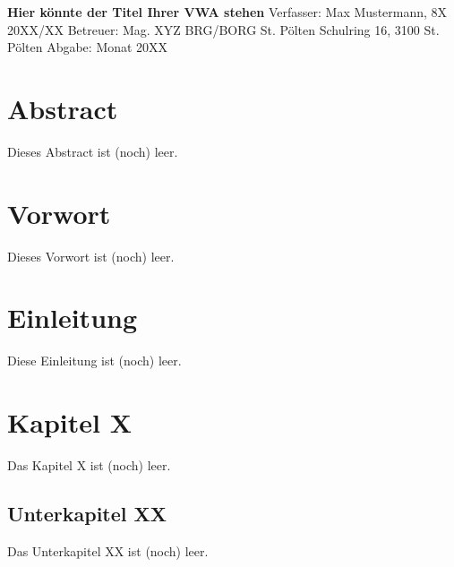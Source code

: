 \documentclass[a4paper,12pt,ngerman,oneside]{scrreprt}	%
\begin{document}
	

	\begin{titlepage}\label{Titleseite}
		
		\vspace*{80mm}\Huge\centering\textbf{Hier könnte der Titel Ihrer VWA stehen\break}
		\vspace{0mm}\hrulefill
		\vspace{7mm}\Large{\break Verfasser: Max Mustermann, 8X 20XX/XX \break Betreuer: Mag. XYZ}
		\vspace{15mm}\Large{\break BRG/BORG St. Pölten \break Schulring 16, 3100 St. Pölten}
		\vspace{70mm}\Large{\break Abgabe: Monat 20XX}
		
	\end{titlepage}
	
	
	\renewcommand{\abstractname}{Abstract}	
	\chapter*{Abstract}\label{Abstract}
		Dieses Abstract ist (noch) leer.
		\thispagestyle{empty}
	
	\chapter*{Vorwort}\label{Vorwort}
		Dieses Vorwort ist (noch) leer.
		\thispagestyle{empty}
	


	\begingroup
		\renewcommand*{\chapterpagestyle}{empty}
		\pagestyle{empty}
		\tableofcontents
		\clearpage
	\endgroup

	
	\chapter{Einleitung}\label{Einleitung}
	Diese Einleitung ist (noch) leer.
	



	\chapter{Kapitel X}
	Das Kapitel X ist (noch) leer.
		\section{Unterkapitel XX} 
		Das Unterkapitel XX ist (noch) leer.
\end{document}
